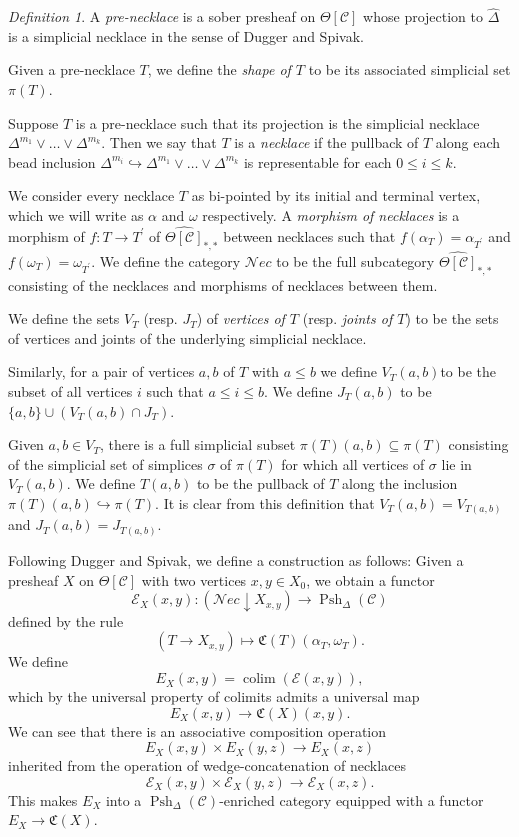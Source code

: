 \documentclass{amsart}
\numberwithin{equation}{section}
\theoremstyle{plain}   %
\theoremstyle{remark}
\newtheorem{defn}[subsection]{Definition}
\theoremstyle{plain}
\DeclareMathOperator{\colim}{colim}
\DeclareMathOperator{\Psh}{Psh}
\newcommand{\Nec}{\ensuremath{{\mathcal{N}ec}}}
\newcommand{\overcat}[2]{{(#1\downarrow #2)}}
\newcommand{\psh}[1]{\ensuremath{\widehat{#1}}}
\newcommand{\C}{\ensuremath{\mathcal{C}}}
\newcommand{\cellset}{\ensuremath{\widehat{\Theta[\mathcal{C}]}}}
\begin{document}
\begin{defn}
	A \emph{pre-necklace} is a sober presheaf on \(\Theta[\C]\) whose projection to \(\psh{\Delta}\) is a simplicial necklace in the sense of Dugger and Spivak.

	Given a pre-necklace \(T\), we define the \emph{shape of \(T\)} to be its associated simplicial set \(\pi(T)\).

	Suppose \(T\) is a pre-necklace such that its projection is the simplicial necklace \(\Delta^{m_1}\vee \dots \vee \Delta^{m_k}\). Then we say that \(T\) is a \emph{necklace} if the pullback of \(T\) along each bead inclusion \(\Delta^{m_i}\hookrightarrow \Delta^{m_1}\vee \dots \vee \Delta^{m_k}\) is representable for each \(0\leq i \leq k\).

	We consider every necklace \(T\) as bi-pointed by its initial and terminal vertex, which we will write as \(\alpha\) and \(\omega\) respectively.  A \emph{morphism of necklaces} is a morphism of \(f:T\to T^\prime\) of \(\cellset_{\ast,\ast}\) between necklaces such that \(f(\alpha_T)=\alpha_{T^\prime}\) and \(f(\omega_T)=\omega_{T^\prime}\). We define the category \(\Nec\) to be the full subcategory \(\cellset_{\ast,\ast}\) consisting of the necklaces and morphisms of necklaces between them.

	We define the sets \(V_T\) (resp. \(J_T\)) of \emph{vertices of \(T\)} (resp. \emph{joints of \(T\)}) to be the sets of vertices and joints of the underlying simplicial necklace.

	Similarly, for a pair of vertices \(a,b\) of \(T\) with \(a\leq b\) we define \(V_T(a,b)\)to be the subset of all vertices \(i\) such that \(a\leq i\leq b\). We define \(J_T(a,b)\) to be \(\{a,b\}\cup (V_T(a,b)\cap J_T)\).

	Given \(a,b\in V_T\), there is a full simplicial subset \(\pi(T)(a,b)\subseteq \pi(T)\) consisting of the simplicial set of simplices \(\sigma\) of \(\pi(T)\) for which all vertices of \(\sigma\) lie in \(V_T(a,b)\). We define \(T(a,b)\) to be the pullback of \(T\) along the inclusion \(\pi(T)(a,b)\hookrightarrow \pi(T)\).  It is clear from this definition that \(V_T(a,b)=V_{T(a,b)}\) and \(J_T(a,b)=J_{T(a,b)}\).
\end{defn}

Following Dugger and Spivak, we define a construction as follows: Given a presheaf \(X\) on \(\Theta[\C]\) with two vertices \(x,y\in X_0\), we obtain a functor \[\mathcal{E}_X(x,y):\overcat{\Nec}{X_{x,y}} \to \Psh_\Delta(\C)\] defined by the rule \[(T\to X_{x,y})\mapsto \mathfrak{C}(T)(\alpha_T,\omega_T).\] We define \[E_X(x,y)=\colim(\mathcal{E}(x,y)),\] which by the universal property of colimits admits a universal map \[E_X(x,y)\to \mathfrak{C}(X)(x,y).\] We can see that there is an associative composition operation \[E_X(x,y)\times E_X(y,z)\to E_X(x,z)\] inherited from the operation of wedge-concatenation of necklaces \[\mathcal{E}_X(x,y)\times \mathcal{E}_X(y,z) \to \mathcal{E}_X(x,z).\] This makes \(E_X\) into a \(\Psh_\Delta(\C)\)-enriched category equipped with a functor \(E_X\to \mathfrak{C}(X)\).
\end{document}
